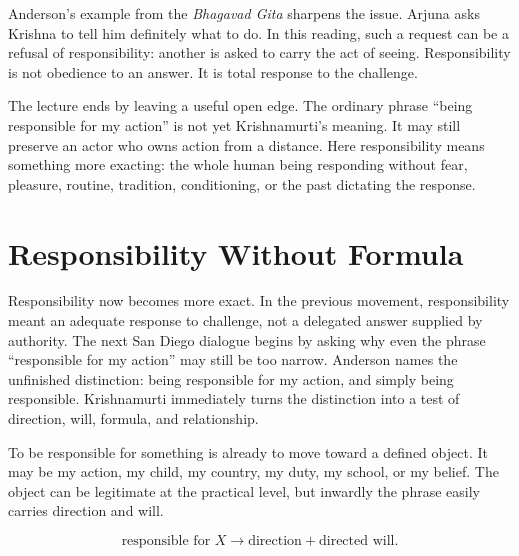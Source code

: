 \documentclass[11pt,oneside]{book}
\begin{document}
Anderson's example from the \emph{Bhagavad Gita} sharpens the issue. Arjuna asks Krishna to tell him definitely what to do. In this reading, such a request can be a refusal of responsibility: another is asked to carry the act of seeing. Responsibility is not obedience to an answer. It is total response to the challenge.

The lecture ends by leaving a useful open edge. The ordinary phrase ``being responsible for my action'' is not yet Krishnamurti's meaning. It may still preserve an actor who owns action from a distance. Here responsibility means something more exacting: the whole human being responding without fear, pleasure, routine, tradition, conditioning, or the past dictating the response.


\chapter{Responsibility Without Formula}

Responsibility now becomes more exact. In the previous movement, responsibility meant an adequate response to challenge, not a delegated answer supplied by authority. The next San Diego dialogue begins by asking why even the phrase ``responsible for my action'' may still be too narrow. Anderson names the unfinished distinction: being responsible for my action, and simply being responsible. Krishnamurti immediately turns the distinction into a test of direction, will, formula, and relationship.

To be responsible for something is already to move toward a defined object. It may be my action, my child, my country, my duty, my school, or my belief. The object can be legitimate at the practical level, but inwardly the phrase easily carries direction and will.

\begin{equation}
\text{responsible for } X
\longrightarrow
\text{direction}+\text{directed will}.
\end{equation}
\end{document}
